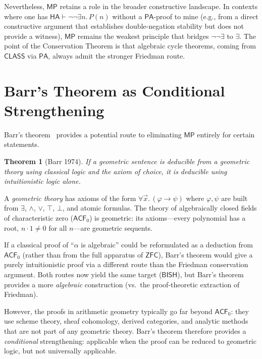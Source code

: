 \documentclass[11pt,a4paper]{article}
\theoremstyle{plain}
\newtheorem{theorem}{Theorem}[section]
\theoremstyle{definition}
\newcommand{\BISH}{\textsf{BISH}}
\newcommand{\MP}{\textsf{MP}}
\newcommand{\CLASS}{\textsf{CLASS}}
\newcommand{\HA}{\textsf{HA}}
\newcommand{\PA}{\textsf{PA}}
\newcommand{\ZFC}{\textsf{ZFC}}
\begin{document}
Nevertheless, $\MP$ retains a role in the broader constructive landscape.  In contexts where one has $\HA \vdash \lnot\lnot\exists n.\, P(n)$ without a $\PA$-proof to mine (e.g., from a direct constructive argument that establishes double-negation stability but does not provide a witness), $\MP$ remains the weakest principle that bridges $\lnot\lnot\exists$ to $\exists$.  The point of the Conservation Theorem is that algebraic cycle theorems, coming from $\CLASS$ via $\PA$, always admit the stronger Friedman route.


\section{Barr's Theorem as Conditional Strengthening}\label{sec:barr}

Barr's theorem~\cite{barr1974} provides a potential route to eliminating $\MP$ entirely for certain statements.

\begin{theorem}[Barr 1974]\label{thm:barr}
If a geometric sentence is deducible from a geometric theory using classical logic and the axiom of choice, it is deducible using intuitionistic logic alone.
\end{theorem}

A \emph{geometric theory} has axioms of the form $\forall \vec{x}.\, (\varphi \to \psi)$ where $\varphi, \psi$ are built from $\exists$, $\land$, $\lor$, $\top$, $\bot$, and atomic formulas.  The theory of algebraically closed fields of characteristic zero ($\textsf{ACF}_0$) is geometric: its axioms---every polynomial has a root, $n \cdot 1 \ne 0$ for all $n$---are geometric sequents.

If a classical proof of ``$\alpha$ is algebraic'' could be reformulated as a deduction from $\textsf{ACF}_0$ (rather than from the full apparatus of $\ZFC$), Barr's theorem would give a purely intuitionistic proof via a different route than the Friedman conservation argument.  Both routes now yield the same target ($\BISH$), but Barr's theorem provides a more \emph{algebraic} construction (vs.\ the proof-theoretic extraction of Friedman).

However, the proofs in arithmetic geometry typically go far beyond $\textsf{ACF}_0$: they use scheme theory, sheaf cohomology, derived categories, and analytic methods that are not part of any geometric theory.  Barr's theorem therefore provides a \emph{conditional} strengthening: applicable when the proof can be reduced to geometric logic, but not universally applicable.
\end{document}
